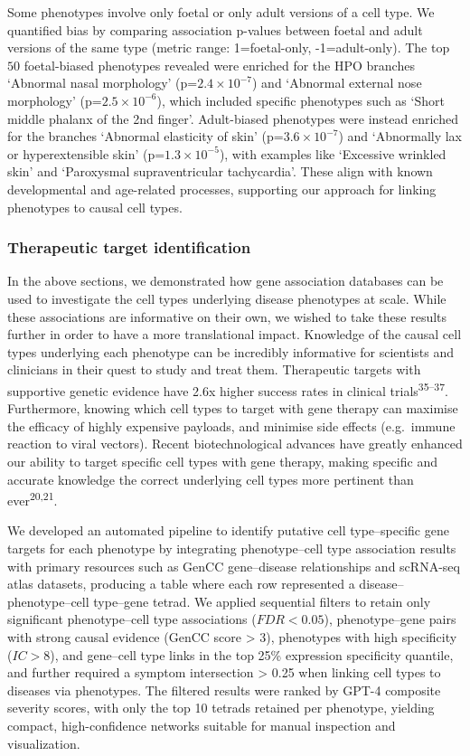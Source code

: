 \documentclass[
]{article}
\begin{document}
Some phenotypes involve only foetal or only adult versions of a cell
type. We quantified bias by comparing association p-values between
foetal and adult versions of the same type (metric range: 1=foetal-only,
-1=adult-only). The top \(50\) foetal-biased phenotypes revealed were
enriched for the HPO branches `Abnormal nasal morphology'
(p=\(2.4 \times 10^{-7}\)) and `Abnormal external nose morphology'
(p=\(2.5 \times 10^{-6}\)), which included specific phenotypes such as
`Short middle phalanx of the 2nd finger'. Adult-biased phenotypes were
instead enriched for the branches `Abnormal elasticity of skin'
(p=\(3.6 \times 10^{-7}\)) and `Abnormally lax or hyperextensible skin'
(p=\(1.3 \times 10^{-5}\)), with examples like `Excessive wrinkled skin'
and `Paroxysmal supraventricular tachycardia'. These align with known
developmental and age-related processes, supporting our approach for
linking phenotypes to causal cell types.

\subsubsection{Therapeutic target
identification}\label{therapeutic-target-identification}

In the above sections, we demonstrated how gene association databases
can be used to investigate the cell types underlying disease phenotypes
at scale. While these associations are informative on their own, we
wished to take these results further in order to have a more
translational impact. Knowledge of the causal cell types underlying each
phenotype can be incredibly informative for scientists and clinicians in
their quest to study and treat them. Therapeutic targets with supportive
genetic evidence have 2.6x higher success rates in clinical
trials\textsuperscript{35--37}. Furthermore, knowing which cell types to
target with gene therapy can maximise the efficacy of highly expensive
payloads, and minimise side effects (e.g.~immune reaction to viral
vectors). Recent biotechnological advances have greatly enhanced our
ability to target specific cell types with gene therapy, making specific
and accurate knowledge the correct underlying cell types more pertinent
than ever\textsuperscript{20,21}.

We developed an automated pipeline to identify putative cell
type--specific gene targets for each phenotype by integrating
phenotype--cell type association results with primary resources such as
GenCC gene--disease relationships and scRNA-seq atlas datasets,
producing a table where each row represented a disease--phenotype--cell
type--gene tetrad. We applied sequential filters to retain only
significant phenotype--cell type associations (\(FDR<0.05\)),
phenotype--gene pairs with strong causal evidence (GenCC score
\textgreater{} 3), phenotypes with high specificity (\(IC>8\)), and
gene--cell type links in the top 25\% expression specificity quantile,
and further required a symptom intersection \textgreater{} 0.25 when
linking cell types to diseases via phenotypes. The filtered results were
ranked by GPT-4 composite severity scores, with only the top 10 tetrads
retained per phenotype, yielding compact, high-confidence networks
suitable for manual inspection and visualization.
\end{document}
